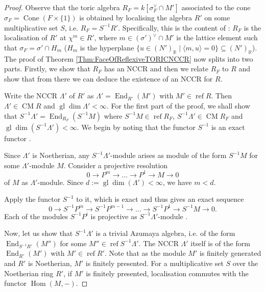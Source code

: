 \documentclass[reqno, 12pt]{amsart}
\theoremstyle{definition}
\numberwithin{equation}{section}
\newcommand{\Hom}{\operatorname{Hom}}
\newcommand{\R}{\mathbb{R}}
\newcommand{\End}{\operatorname{End}}
\newcommand{\gldim}{\operatorname{gl}\dim}
\newcommand{\cone}{\operatorname{Cone}}
\begin{document}
\begin{proof}

    Observe that the toric algebra $R_F=k[\sigma_F^\vee\cap M']$ associated to the cone $\sigma_F=\cone(F\times\{1\})$ is obtained by localising the algebra $R'$ on some multiplicative set $S$, i.e. $R_F=S^{-1}R'$. Specifically, this is the content of \cite[Proposition 1.3.16]{CLS}: $R_F$ is the localisation of $R'$ at $\chi^m\in R'$, where $m\in (\sigma')^\vee\cap M'$ is the lattice element such that $\sigma_F=\sigma'\cap H_m$ ($H_m$ is the hyperplane $\{u\in (N')_\R\mid\langle m,u\rangle=0\}\subseteq (N')_\R$). The proof of Theorem \ref{Thm:FaceOfReflexiveTORICNCCR} now splits into two parts. Firstly, we show that $R_F$ has an NCCR and then we relate $R_F$ to $R$ and show that from there we can deduce the existence of an NCCR for $R$.

    Write the NCCR $\Lambda'$ of $R'$ as $\Lambda'=\End_{R'}(M')$ with $M'\in \operatorname{ref}R$. Then $\Lambda'\in \operatorname{CM}R$ and $\gldim\Lambda'<\infty$. For the first part of the proof, we shall show that $S^{-1}\Lambda'=\End_{R_F}(S^{-1}M)$ where $S^{-1}M\in \operatorname{ref}R_F$, $S^{-1}\Lambda'\in \operatorname{CM}R_F$ and $\gldim(S^{-1}\Lambda')<\infty$.
    We begin by noting that the functor $S^{-1}$ is an exact functor \cite[Proposition 3.3]{AtiyahMcD}. 
    
    Since $\Lambda'$ is Noetherian, any $S^{-1}\Lambda'$-module arises as module of the form $S^{-1}M$ for some $\Lambda'$-module $M$. Consider a projective resolution \[0\rightarrow P^m\rightarrow\dots\rightarrow P^1\rightarrow M\rightarrow 0\] of $M$ as $\Lambda'$-module. Since $d:=\gldim(\Lambda')<\infty$, we have $m<d$.  
    
    Apply the functor $S^{-1}$ to it, which is exact and thus gives an exact sequence \[
    0\rightarrow S^{-1}P^m\rightarrow S^{-1}P^{m-1}\rightarrow\dots\rightarrow S^{-1}P^1\rightarrow S^{-1}M\rightarrow 0.
    \]
    Each of the modules $S^{-1}P^i$ is projective as $S^{-1}\Lambda'$-module \cite[Lemma 10.109.13]{stacks}.

    Now, let us show that $S^{-1}\Lambda'$ is a trivial Azumaya algebra, i.e. of the form $\End_{S^{-1}R'}(M'')$ for some $M''\in \operatorname{ref}S^{-1}\Lambda'$. The NCCR $\Lambda'$ itself is of the form $\End_{R'}(M')$ with $M'\in\operatorname{ref} R'$. Note that as the module $M'$ is finitely generated and $R'$ is Noetherian, $M'$ is finitely presented. For a multiplicative set $S$ over the Noetherian ring $R'$, if $M'$ is finitely presented, localisation commutes with the functor $\Hom(M,-)$. 
   

\end{proof}
\end{document}
